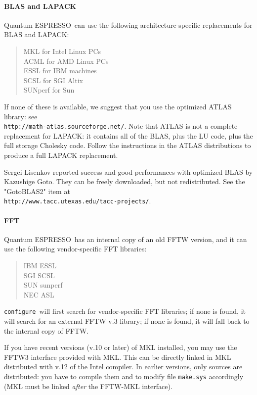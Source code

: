 \documentclass[12pt,a4paper]{article}
\def\qe{{\sc Quantum ESPRESSO}}
\def\configure{\texttt{configure}}
\begin{document}
\paragraph{BLAS and LAPACK} 
\qe\ can use the following architecture-specific replacements for BLAS and LAPACK:\\
\begin{quote}
MKL for Intel Linux PCs\\
ACML for AMD Linux PCs\\
ESSL for IBM machines\\
SCSL for SGI Altix\\
SUNperf for Sun
\end{quote}
If none of these is available, we suggest that you use the optimized ATLAS library: see \\
\texttt{http://math-atlas.sourceforge.net/}. Note that ATLAS is not
a complete replacement for LAPACK: it contains all of the BLAS, plus the
LU code, plus the full storage Cholesky code. Follow the instructions in the
ATLAS distributions to produce a full LAPACK replacement.
    
Sergei Lisenkov reported success and good performances with optimized
BLAS by Kazushige Goto. They can be freely downloaded,
but not redistributed. See the "GotoBLAS2" item at\\
\texttt{http://www.tacc.utexas.edu/tacc-projects/}.

\paragraph{FFT}
\qe\ has an internal copy of an old FFTW version, and it 
can use the following vendor-specific FFT libraries:
\begin{quote}
      IBM ESSL\\
      SGI SCSL\\
      SUN sunperf\\
      NEC ASL
\end{quote}
\configure\ will first search for vendor-specific FFT libraries;
if none is found, it will search for an external FFTW v.3 library;
if none is found, it will fall back to the internal  copy of FFTW.

If you have recent versions (v.10 or later) of MKL installed, you 
may use the FFTW3 interface provided with MKL. This can be directly
linked in MKL distributed with v.12 of the Intel compiler. In earlier 
versions, only sources are distributed: you have to compile them and 
to modify file \texttt{make.sys} accordingly 
(MKL must be linked {\em after} the FFTW-MKL interface).
\end{document}
